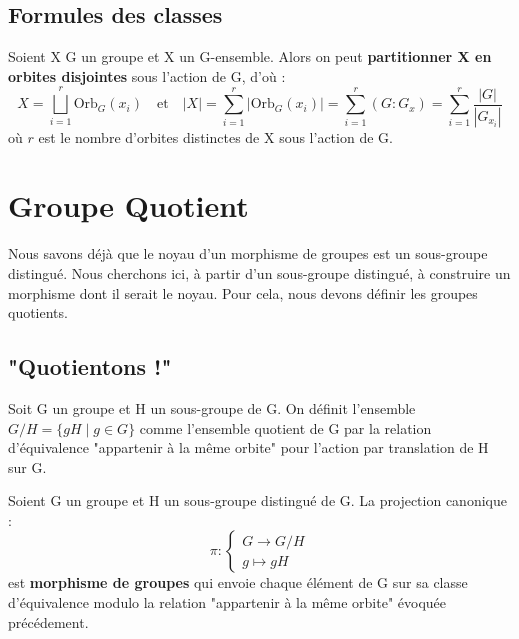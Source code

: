 \newpage
\subsection{Formules des classes}

\begin{corollary}
	Soient X G un groupe et X un G-ensemble. Alors on peut \textbf{partitionner X en orbites disjointes} sous l'action de G, d'où :
	\[ X = \bigsqcup_{i=1}^r \text{Orb}_G(x_i) \quad \text{et} \quad |X| = \sum_{i=1}^{r} |\text{Orb}_G(x_i)| = \sum_{i=1}^{r} (G : G_x) = \sum_{i=1}^{r} \frac{ |G| }{ |G_{x_i}| } \]
	où $r$ est le nombre d'orbites distinctes de X sous l'action de G. 
\end{corollary}



\section{Groupe Quotient}

Nous savons déjà que le noyau d'un morphisme de groupes est un sous-groupe distingué. 
Nous cherchons ici, à partir d'un sous-groupe distingué, à construire un morphisme dont il serait le noyau. 
Pour cela, nous devons définir les groupes quotients. 

\subsection{"Quotientons !"}

Soit G un groupe et H un sous-groupe de G. On définit l'ensemble $G/H = \{gH \; | \; g \in G\}$ comme l'ensemble quotient de G par la relation d'équivalence "appartenir à la même orbite"
pour l'action par translation de H sur G. 

\begin{definition}
	Soient G un groupe et H un sous-groupe distingué de G. La projection canonique : 
	\[\pi : 
		\begin{cases}
			G \longrightarrow G/H \\ 
			g \longmapsto gH 
		\end{cases}
	\]
	est  \textbf{morphisme de groupes} qui envoie chaque élément de G sur sa classe d'équivalence modulo la relation "appartenir à la même orbite" évoquée précédement. 
\end{definition}

